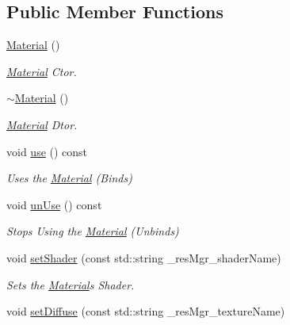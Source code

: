 \subsection*{Public Member Functions}
\begin{DoxyCompactItemize}
\item 
\hyperlink{class_cookie_eng_1_1_resources_1_1_material_a20a77072223e5948a5842aa71cf04eff}{Material} ()
\begin{DoxyCompactList}\small\item\em \hyperlink{class_cookie_eng_1_1_resources_1_1_material}{Material} Ctor. \end{DoxyCompactList}\item 
\hyperlink{class_cookie_eng_1_1_resources_1_1_material_aa2fb7a1c6a22e6e3a4271ad4aca8f0a6}{$\sim$\+Material} ()
\begin{DoxyCompactList}\small\item\em \hyperlink{class_cookie_eng_1_1_resources_1_1_material}{Material} Dtor. \end{DoxyCompactList}\item 
void \hyperlink{class_cookie_eng_1_1_resources_1_1_material_aeafea03fdfdaef5fb7be763e8948f416}{use} () const
\begin{DoxyCompactList}\small\item\em Uses the \hyperlink{class_cookie_eng_1_1_resources_1_1_material}{Material} (Binds) \end{DoxyCompactList}\item 
void \hyperlink{class_cookie_eng_1_1_resources_1_1_material_a7316b5a9dcc1b71b5090b5d54c7ac222}{un\+Use} () const
\begin{DoxyCompactList}\small\item\em Stops Using the \hyperlink{class_cookie_eng_1_1_resources_1_1_material}{Material} (Unbinds) \end{DoxyCompactList}\item 
void \hyperlink{class_cookie_eng_1_1_resources_1_1_material_a55455e741fb79ffd11be29967097709c}{set\+Shader} (const std\+::string \+\_\+res\+Mgr\+\_\+shader\+Name)
\begin{DoxyCompactList}\small\item\em Sets the \hyperlink{class_cookie_eng_1_1_resources_1_1_material}{Material}\textquotesingle{}s Shader. \end{DoxyCompactList}\item 
void \hyperlink{class_cookie_eng_1_1_resources_1_1_material_a833ddee7037c0cef8c8c389e64f3d76b}{set\+Diffuse} (const std\+::string \+\_\+res\+Mgr\+\_\+texture\+Name)

\end{DoxyCompactItemize}
